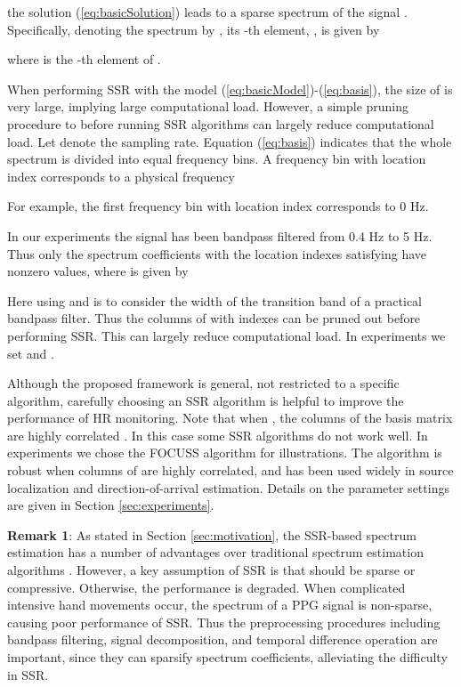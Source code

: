 \documentclass[10pt,twocolumn]{IEEEtran}
\begin{document}
the solution (\ref{eq:basicSolution}) leads to a sparse spectrum of the signal . Specifically, denoting the spectrum by , its -th element, , is given by

where  is the -th element of .


When performing SSR with the model (\ref{eq:basicModel})-(\ref{eq:basis}), the size of  is very large, implying large computational load. However, a simple pruning procedure to  before running SSR algorithms can largely reduce computational load. Let  denote the sampling rate. Equation (\ref{eq:basis}) indicates that the whole spectrum  is divided into  equal frequency bins. A frequency bin with location index  corresponds to a physical frequency

For example, the first frequency bin with location index  corresponds to 0 Hz.

In our experiments the signal has been bandpass filtered from 0.4 Hz to 5 Hz. Thus only the spectrum coefficients with the location indexes  satisfying  have nonzero values, where  is given by

Here using  and  is to consider the width of the transition band of a practical bandpass filter. Thus the columns of  with indexes  can be pruned out before performing SSR. This can largely reduce computational load. In experiments we set  and .






Although the proposed framework is general, not restricted to a specific algorithm, carefully choosing an SSR algorithm is helpful to improve the performance of HR monitoring. Note that when , the columns of the basis matrix  are highly correlated \cite{duarte2013spectral}. In this case some SSR algorithms do not work well. In experiments we chose the FOCUSS algorithm \cite{Gorodnitsky1997} for illustrations. The algorithm is robust when columns of  are highly correlated, and has been used widely in source localization and direction-of-arrival estimation. Details on the parameter settings are given in Section \ref{sec:experiments}.





\textbf{Remark 1}: As stated in Section \ref{sec:motivation}, the SSR-based spectrum estimation has a number of advantages over traditional  spectrum estimation algorithms \cite{Gorodnitsky1997,duarte2013spectral}. However, a key assumption of SSR is that  should be sparse or compressive. Otherwise, the performance is degraded. When complicated intensive hand movements occur, the spectrum of a PPG signal is non-sparse, causing poor performance of SSR. Thus the preprocessing procedures including bandpass filtering, signal decomposition, and temporal difference operation are important, since they can sparsify spectrum coefficients, alleviating the difficulty in SSR.
\end{document}
